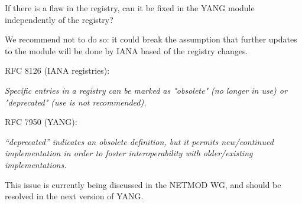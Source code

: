 \endColumn


If there is a flaw in the registry, can it be fixed in the YANG module
independently of the registry?

We recommend not to do so: it could break the assumption that further
updates to the module will be done by IANA based of the registry
changes.


\bulletList

\item RFC 8126 (IANA registries):

{\it Specific entries in a registry can be marked as "obsolete" (no longer
in use) or "deprecated" (use is not recommended).}

\item RFC 7950 (YANG):

{\it “deprecated” indicates an obsolete definition, but it permits
new/continued implementation in order to foster interoperability with
older/existing implementations.}

\endBulletList

This issue is currently being discussed in the NETMOD WG, and should
be resolved in the next version of YANG.

\bye
